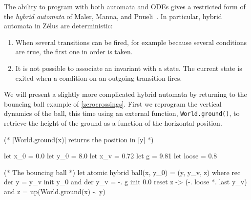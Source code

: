 \documentclass[11pt,titlepage,twoside]{report}
\makeatletter
\newcommand{\zls}[1]{{\@span{class="zelusinline"}#1}}
\newcommand{\zls}[1]{\texttt{#1}}
\renewcommand{\zls}[1]{\texttt{#1}}
\newcommand{\zelus}{{\sf Z\'elus}}
\makeatother
\begin{document}
%
%


The ability to program with both automata and ODEs gives a restricted form 
of the \emph{hybrid automata} of Maler, Manna, and 
Pnueli~\cite{MalerMannaPnueli:hybrid92}.
In particular, hybrid automata in \zelus{} are deterministic:
\begin{enumerate}
\item When several transitions can be fired, for example because several 
conditions are true, the first one in order is taken.

\item It is not possible to associate an invariant with a state.
The current state is exited when a condition on an outgoing transition 
fires.
\end{enumerate}

We will present a slightly more complicated hybrid automata by returning to 
the bouncing ball example of \cref{zerocrossings}.
First we reprogram the vertical dynamics of the ball, this time using an 
external function, \zls{World.ground()}, to retrieve the height of the 
ground as a function of the horizontal position.
\begin{chklisting}[withresult]
(* [World.ground(x)] returns the position in [y] *)

let x_0 = 0.0
let y_0 = 8.0
let x_v = 0.72
let g = 9.81
let loose = 0.8

(* The bouncing ball *)
let atomic hybrid ball(x, y_0) = (y, y_v, z) where
  rec der y = y_v init y_0
  and der y_v = -. g init 0.0 reset z -> (-. loose *. last y_v)
  and z = up(World.ground(x) -. y)
\end{chklisting}
\end{document}
